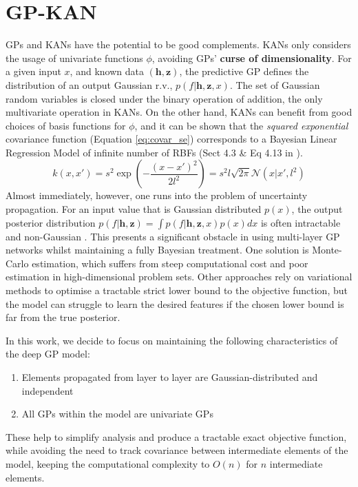 \documentclass{article}
\begin{document}
\section{GP-KAN}
GPs and KANs have the potential to be good complements. KANs only considers the usage of univariate functions $\phi$, avoiding GPs' \textbf{curse of dimensionality}. For a given input $x$, and known data $(\boldsymbol{h}, \boldsymbol{z})$, the predictive GP defines the distribution of an output Gaussian r.v., $p(f|\boldsymbol{h},\boldsymbol{z},x)$. The set of Gaussian random variables is closed under the binary operation of addition, the only multivariate operation in KANs. On the other hand, KANs can benefit from good choices of basis functions for $\phi$, and it can be shown that the \textit{squared exponential} covariance function (Equation \ref{eq:covar_se}) corresponds to a Bayesian Linear Regression Model of infinite number of RBFs (Sect 4.3 \& Eq 4.13 in \cite{GaussianProcess}).
\begin{equation}
    k(x,x')=s^2\exp\left(-\frac{(x-x')^2}{2l^2}\right)=s^2l\sqrt{2\pi}\mathcal{N}(x|x',l^2)
    \label{eq:covar_se}
\end{equation}
Almost immediately, however, one runs into the problem of uncertainty propagation. For an input value that is Gaussian distributed $p(x)$, the output posterior distribution $p(f|\boldsymbol{h},\boldsymbol{z})=\int p(f|\boldsymbol{h},\boldsymbol{z},x)p(x)dx$ is often intractable and non-Gaussian \cite{deepGP, GPLVM}. This presents a significant obstacle in using multi-layer GP networks whilst maintaining a fully Bayesian treatment. One solution is Monte-Carlo estimation, which suffers from steep computational cost and poor estimation in high-dimensional problem sets. Other approaches \cite{deepGP} rely on variational methods to optimise a tractable strict lower bound to the objective function, but the model can struggle to learn the desired features if the chosen lower bound is far from the true posterior.

In this work, we decide to focus on maintaining the following characteristics of the deep GP model:
\begin{enumerate}
    \item Elements propagated from layer to layer are Gaussian-distributed and independent
    \item All GPs within the model are univariate GPs
\end{enumerate}
These help to simplify analysis and produce a tractable exact objective function, while avoiding the need to track covariance between intermediate elements of the model, keeping the computational complexity to $O(n)$ for $n$ intermediate elements.
\end{document}
